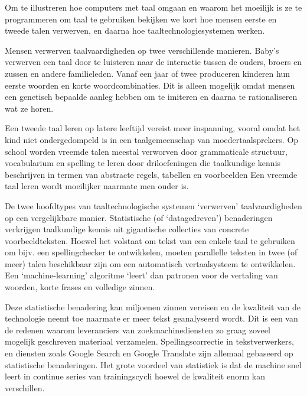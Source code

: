 \begin{multicols}{2}
 Om te illustreren hoe computers met taal omgaan en waarom het moeilijk is ze te programmeren om taal te gebruiken bekijken we kort hoe mensen eerste en tweede talen verwerven, en daarna hoe taaltechnologiesystemen werken.


 Mensen verwerven taalvaardigheden op twee verschillende manieren. Baby's verwerven een taal door te luisteren naar de interactie tussen de ouders, broers en zussen en andere familieleden. Vanaf een jaar of twee produceren kinderen hun eerste woorden en korte woordcombinaties. Dit is alleen mogelijk omdat mensen een genetisch bepaalde aanleg hebben om te imiteren en daarna te rationaliseren wat ze horen.

    Een tweede taal leren op latere leeftijd vereist meer inspanning, vooral omdat het kind niet ondergedompeld is in een taalgemeenschap van moedertaalsprekers. Op school worden vreemde talen meestal verworven door grammaticale structuur, vocabularium en spelling te leren door driloefeningen die taalkundige kennis beschrijven in termen van abstracte regels, tabellen en voorbeelden Een vreemde taal leren wordt moeilijker naarmate men ouder is.

    De twee hoofdtypes van taaltechnologische systemen `verwerven' taalvaardigheden op een vergelijkbare manier. Statistische (of `datagedreven') benaderingen verkrijgen taalkundige kennis uit gigantische collecties van concrete voorbeeldteksten. Hoewel het volstaat om tekst van een enkele taal te gebruiken om bijv. een spellingchecker te ontwikkelen, moeten parallelle teksten in twee (of meer) talen beschikbaar zijn om een automatisch vertaalsysteem te ontwikkelen. Een `machine-learning' algoritme `leert' dan patronen voor de vertaling van woorden, korte frases en volledige zinnen.

    Deze statistische benadering kan miljoenen zinnen vereisen en de kwaliteit van de technologie neemt toe naarmate er meer tekst geanalyseerd wordt. Dit is een van de redenen waarom leveranciers van zoekmachinediensten zo graag zoveel mogelijk geschreven materiaal verzamelen. Spellingscorrectie in tekstverwerkers, en diensten zoals Google Search en Google Translate zijn allemaal gebaseerd op statistische benaderingen. Het grote voordeel van statistiek is dat de machine snel leert in continue series van trainingscycli hoewel de kwaliteit enorm kan verschillen.


\end{multicols}

